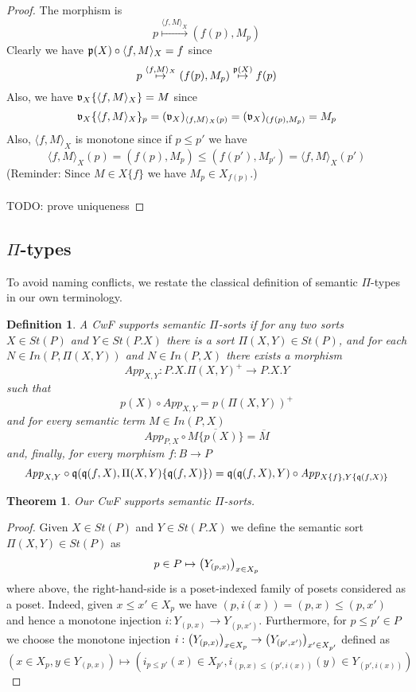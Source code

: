 \documentclass{article}
\newtheorem{thm}{Theorem}
\newtheorem{definition}{Definition}
\newcommand{\fm}[2]{
\left(
\tiny
#1
\normalsize
\right)_{#2}
}
\begin{document}
\begin{proof}
The morphism is
$$p \overset{\langle f, M \rangle_X}{\mapsto} (f(p), M_{p})$$
Clearly we have $\frak p(X) \circ \langle f, M \rangle_X = f$ since
$$p \overset{\langle f, M \rangle_X}{\mapsto} (f(p), M_{p}) \overset{\frak p(X)}{\mapsto} f(p)$$
Also, we have $\frak v_X \{ \langle f, M \rangle_X \} = M$ since
$$\frak v_X \{ \langle f, M \rangle_X \}_p = (\frak v_X)_{\langle f , M \rangle_X(p)} = (\frak v_X)_{(f(p), M_p)} = M_p$$
Also, $\langle f, M \rangle_X$ is monotone since if $p \leq p'$ we have
$$\langle f, M \rangle_X (p) = (f(p), M_p) \leq (f(p'), M_{p'}) = \langle f, M \rangle_X (p')$$
(Reminder: Since $M \in X \{ f \}$ we have $M_p \in X_{f(p)}$.)\\~\\
TODO: prove uniqueness
\end{proof}
 
\subsection*{$\Pi$-types}

To avoid naming conflicts, we restate the classical definition of semantic $\Pi$-types in our own terminology.

\begin{definition}
A CwF supports semantic \emph{$\Pi$-sorts} if for any two sorts $X \in \mathit{St}(P)$ and $Y \in \mathit{St}(P . X)$ there is a sort $\Pi(X,Y) \in \mathit{St}(P)$, and for each $N \in \mathit{In}(P, \Pi(X,Y))$ and $N \in \mathit{In}(P,X)$ there exists a morphism
$$ \mathit{App}_{X, Y} : P.X.\Pi(X,Y)^+ \to P.X.Y $$
such that
$$p(X) \circ \mathit{App}_{X,Y} = p(\Pi(X,Y))^+$$
and for every semantic term $M \in \mathit{In}(P,X)$
$$\mathit{App}_{P,X} \circ \overline{M \{ p(X) \}} = \overline{M}$$
and, finally, for every morphism $f : B \to P$
$$\mathit{App}_{X,Y} \circ \frak q(\frak q(f,X), \Pi(X,Y) \{ \frak q(f, X) \}) = \frak q(\frak q(f,X), Y) \circ \mathit{App}_{X \{ f \}, Y \{ \frak q(f, X) \} }$$
\end{definition}

\begin{thm}
Our CwF supports semantic $\Pi$-sorts.
\end{thm}

\begin{proof}

Given $X \in \mathit{St}(P)$ and $Y \in \mathit{St}(P . X)$ we define the semantic sort $\Pi(X,Y) \in \mathit{St}(P)$ as 
$$p \in P \mapsto \fm{Y_{(p,x)}}{x \in X_p}$$
where above, the right-hand-side is a poset-indexed family of posets considered as a poset. Indeed, given $x \leq x' \in X_p$ we have $(p, i(x)) = (p,x) \leq (p,x')$ and hence a monotone injection $i : Y_{(p,x)} \to Y_{(p,x')}$.
Furthermore, for $p \leq p' \in P$ we choose the monotone injection $i : \fm{Y_{(p,x)}}{x \in X_p} \to \fm{Y_{(p',x')}}{x' \in X_{p'}}$ defined as 
$$(x \in X_p, y \in Y_{(p,x)}) \mapsto (i_{p \leq p'}(x) \in X_{p'}, i_{(p,x) \leq (p',i(x))}(y) \in Y_{(p',i(x))})$$

\end{proof}
\end{document}
